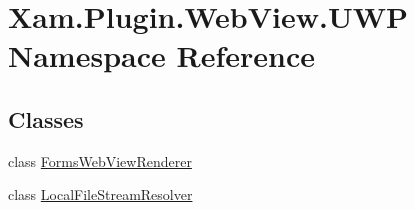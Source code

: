 \hypertarget{namespace_xam_1_1_plugin_1_1_web_view_1_1_u_w_p}{}\section{Xam.\+Plugin.\+Web\+View.\+U\+WP Namespace Reference}
\label{namespace_xam_1_1_plugin_1_1_web_view_1_1_u_w_p}
\subsection*{Classes}
\begin{DoxyCompactItemize}
\item 
class \hyperlink{class_xam_1_1_plugin_1_1_web_view_1_1_u_w_p_1_1_forms_web_view_renderer}{Forms\+Web\+View\+Renderer}
\item 
class \hyperlink{class_xam_1_1_plugin_1_1_web_view_1_1_u_w_p_1_1_local_file_stream_resolver}{Local\+File\+Stream\+Resolver}
\end{DoxyCompactItemize}
